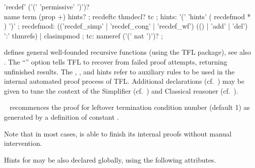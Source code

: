 \begin{isabellebody}
\begin{isamarkuptext}
  \begin{rail}
    'recdef' ('(' 'permissive' ')')? \\ name term (prop +) hints?
    ;
    recdeftc thmdecl? tc
    ;
    hints: '(' 'hints' ( recdefmod * ) ')'
    ;
    recdefmod: (('recdef\_simp' | 'recdef\_cong' | 'recdef\_wf') (() | 'add' | 'del') ':' thmrefs) | clasimpmod
    ;
    tc: nameref ('(' nat ')')?
    ;
  \end{rail}

  \begin{description}
  
  \item \hyperlink{command.HOL.recdef}{\mbox{}} defines general well-founded
  recursive functions (using the TFL package), see also
  \cite{isabelle-HOL}.  The ``'' option tells
  TFL to recover from failed proof attempts, returning unfinished
  results.  The , , and  hints refer to auxiliary rules to be used in the internal
  automated proof process of TFL.  Additional \hyperlink{syntax.clasimpmod}{\mbox{}}
  declarations (cf.\ ) may be given to tune the
  context of the Simplifier (cf.\ ) and
  Classical reasoner (cf.\ ).
  
  \item \hyperlink{command.HOL.recdef-tc}{\mbox{}}~ recommences the
  proof for leftover termination condition number  (default
  1) as generated by a \hyperlink{command.HOL.recdef}{\mbox{}} definition of
  constant .
  
  Note that in most cases, \hyperlink{command.HOL.recdef}{\mbox{}} is able to finish
  its internal proofs without manual intervention.

  \end{description}

  \medskip Hints for \hyperlink{command.HOL.recdef}{\mbox{}} may be also declared
  globally, using the following attributes.


\end{isamarkuptext}
\end{isabellebody}
